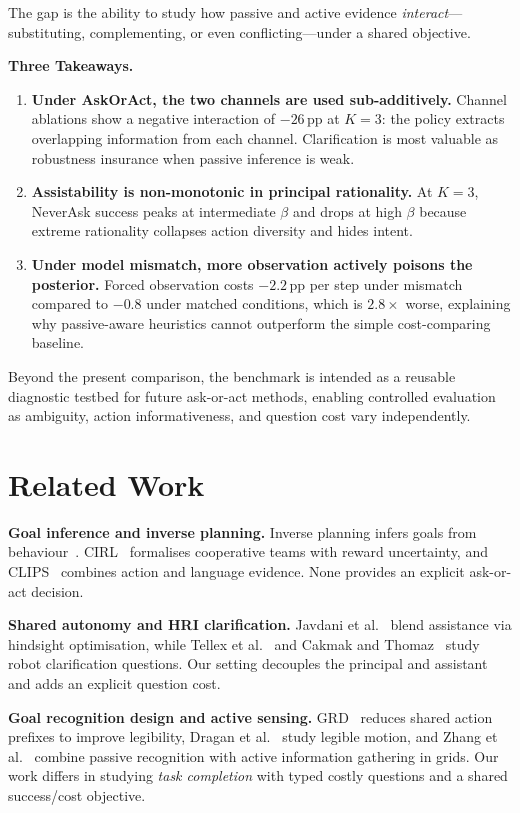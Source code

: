 \documentclass[10pt,twocolumn]{article}
\begin{document}
The gap is the ability to study how passive and active evidence \emph{interact}---substituting, complementing, or even conflicting---under a shared objective.

\textbf{Three Takeaways.}
\begin{enumerate}
  \item \textbf{Under AskOrAct, the two channels are used sub-additively.} Channel ablations show a negative interaction of $-26$\,pp at $K{=}3$: the policy extracts overlapping information from each channel. Clarification is most valuable as robustness insurance when passive inference is weak.
  \item \textbf{Assistability is non-monotonic in principal rationality.} At $K{=}3$, NeverAsk success peaks at intermediate $\beta$ and drops at high $\beta$ because extreme rationality collapses action diversity and hides intent.
  \item \textbf{Under model mismatch, more observation actively poisons the posterior.} Forced observation costs $-2.2$\,pp per step under mismatch compared to $-0.8$ under matched conditions, which is $2.8\times$ worse, explaining why passive-aware heuristics cannot outperform the simple cost-comparing baseline.
\end{enumerate}
Beyond the present comparison, the benchmark is intended as a reusable diagnostic testbed for future ask-or-act methods, enabling controlled evaluation as ambiguity, action informativeness, and question cost vary independently.

\section{Related Work}

\textbf{Goal inference and inverse planning.}
Inverse planning infers goals from behaviour~\cite{baker2009,ramirez2010plan}. CIRL~\cite{hadfield2016cirl} formalises cooperative teams with reward uncertainty, and CLIPS~\cite{tan2024clips} combines action and language evidence.
None provides an explicit ask-or-act decision.

\textbf{Shared autonomy and HRI clarification.}
Javdani et al.~\cite{javdani2015shared} blend assistance via hindsight optimisation, while Tellex et al.~\cite{tellex2014asking} and Cakmak and Thomaz~\cite{cakmak2012designing} study robot clarification questions.
Our setting decouples the principal and assistant and adds an explicit question cost.

\textbf{Goal recognition design and active sensing.}
GRD~\cite{keren2014grd} reduces shared action prefixes to improve legibility, Dragan et al.~\cite{dragan2013legibility} study legible motion, and Zhang et al.~\cite{zhang2025pagr} combine passive recognition with active information gathering in grids.
Our work differs in studying \emph{task completion} with typed costly questions and a shared success/cost objective.
\end{document}
